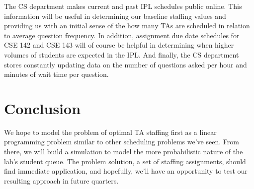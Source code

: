 \documentclass{article}
\begin{document}
\begin{multicols}{2}
The CS department makes current and past IPL schedules public online. This information will be useful in determining our baseline staffing values and providing us with an initial sense of the how many TAs are scheduled in relation to average question frequency. In addition, assignment due date schedules for CSE 142 and CSE 143 will of course be helpful in determining when higher volumes of students are expected in the IPL. And finally, the CS department stores constantly updating data on the number of questions asked per hour and minutes of wait time per question.

\section*{Conclusion}
We hope to model the problem of optimal TA staffing first as a linear programming problem similar to other scheduling problems we've seen. From there, we will build a simulation to model the more probabilistic nature of the lab’s student queue. The problem solution, a set of staffing assignments, should find immediate application, and hopefully, we'll have an opportunity to test our resulting approach in future quarters.

\end{multicols}
\end{document}
